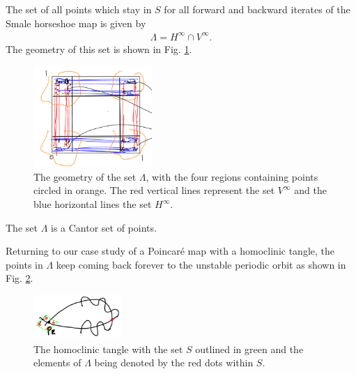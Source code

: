 \begin{definition}
	The set of all points which stay in $S$ for all forward and backward iterates of the Smale horseshoe map  is given by
	 \begin{align}
		\boxed{
\Lambda = H^{\infty } \cap V^{\infty }.
		}
	\end{align}
	The geometry of this set is shown in Fig. \ref{fig:lambda_def}.
	\begin{figure}[h!]
		\centering
		\includegraphics[width=0.4\textwidth]{figures/ch6/19lambda_def.png}
		\caption{The geometry of the set $\Lambda$, with the four regions containing points circled in orange. The red vertical lines represent the set $V^{\infty }$ and the blue horizontal lines the set $H^{\infty }$.}
		\label{fig:lambda_def}
	\end{figure}
\end{definition}

\begin{remark}[]
The set $\Lambda$ is a Cantor set of points.
\end{remark}

Returning to our case study of a Poincaré map with a homoclinic tangle, the points in $\Lambda$ keep coming back forever to the unstable periodic orbit as shown in Fig. \ref{fig:returning_points}. 
\begin{figure}[h!]
	\centering
	\includegraphics[width=0.3\textwidth]{figures/ch6/20returning_points.png}
	\caption{The homoclinic tangle with the set $S$ outlined in green and the elements of $\Lambda$ being denoted by the red dots within $S$.}
	\label{fig:returning_points}
\end{figure}

